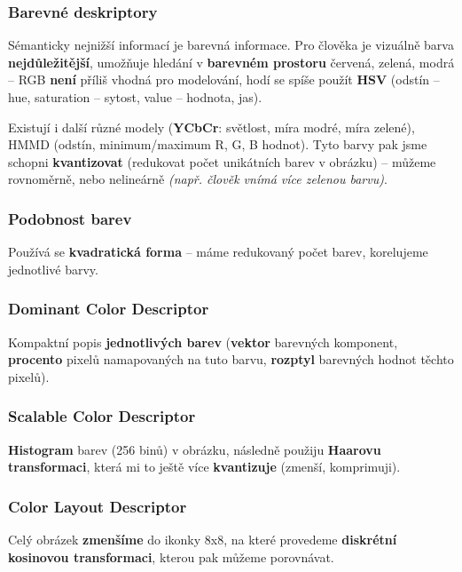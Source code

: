 \subsubsection*{Barevné deskriptory}

Sémanticky nejnižší informací je barevná informace. Pro člověka je vizuálně barva \textbf{nejdůležitější}, umožňuje hledání v \textbf{barevném prostoru} 
červená, zelená, modrá – RGB \textbf{není} příliš vhodná pro modelování, hodí se spíše použít \textbf{HSV} (odstín – hue, saturation – sytost, value – hodnota, jas).

Existují i další různé modely (\textbf{YCbCr}: světlost, míra modré, míra zelené), HMMD (odstín, minimum/maximum R, G, B hodnot). Tyto barvy pak jsme schopni \textbf{kvantizovat} (redukovat počet unikátních barev v obrázku) -- můžeme rovnoměrně, nebo nelineárně \textit{(např. člověk vnímá více zelenou barvu)}.

\subsubsection*{Podobnost barev}

Používá se \textbf{kvadratická forma} -- máme redukovaný počet barev, korelujeme jednotlivé barvy.

\subsubsection*{Dominant Color Descriptor}

Kompaktní popis \textbf{jednotlivých barev} (\textbf{vektor} barevných komponent, \textbf{procento} pixelů namapovaných na tuto barvu, \textbf{rozptyl} barevných hodnot těchto pixelů).

\subsubsection*{Scalable Color Descriptor}

\textbf{Histogram} barev (256 binů) v obrázku, následně použiju \textbf{Haarovu transformaci}, která mi to ještě více \textbf{kvantizuje} (zmenší, komprimuji).

\subsubsection*{Color Layout Descriptor}

Celý obrázek \textbf{zmenšíme} do ikonky 8x8, na které provedeme \textbf{diskrétní kosinovou transformaci}, kterou pak můžeme porovnávat.


